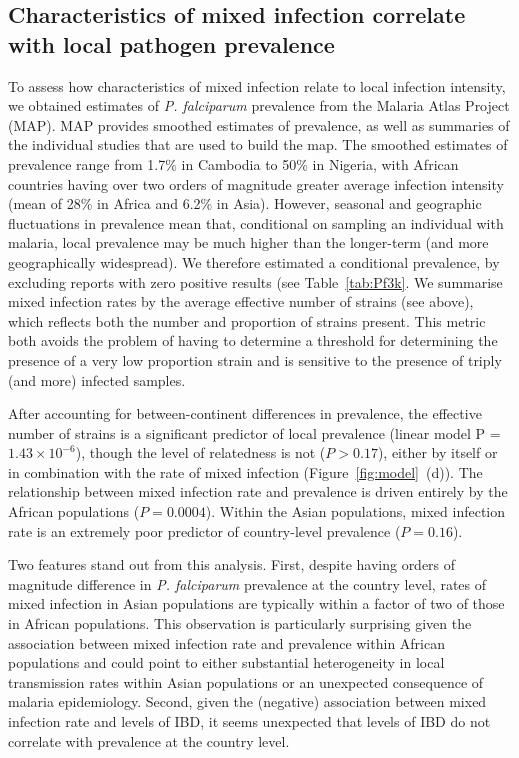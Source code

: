 \documentclass[9pt,lineno]{elife}
\begin{document}
\subsection{Characteristics of mixed infection correlate with local pathogen prevalence}


To assess how characteristics of mixed infection relate to local infection intensity, we obtained estimates of {\it P. falciparum} prevalence from the Malaria Atlas Project (MAP).  MAP provides smoothed estimates of prevalence, as well as summaries of the individual studies that are used to build the map. The smoothed estimates of prevalence  range from 1.7\% in Cambodia to 50\% in Nigeria, with African countries having over two orders of magnitude greater average infection intensity (mean of 28\% in Africa and 6.2\% in Asia). However, seasonal and geographic fluctuations in prevalence mean that, conditional on sampling an individual with malaria, local prevalence may be much higher than the longer-term (and more geographically widespread).  We therefore estimated a conditional prevalence, by excluding reports with zero positive results (see Table~\ref{tab:Pf3k}.
 We summarise mixed infection rates by the average effective number of strains (see above), which reflects both the number and proportion of strains present.  This metric both avoids the problem of having to determine a threshold for determining the presence of a very low proportion strain and is sensitive to the presence of triply (and more) infected samples.

After accounting for between-continent differences in prevalence, the effective number of strains is a significant predictor of local prevalence (linear model P = $1.43 \times 10^{-6}$), though the level of relatedness is not ($P>0.17$), either by itself or in combination with the rate of mixed infection (Figure~\ref{fig:model}~(d)).  The relationship between mixed infection rate and prevalence is driven entirely by the African populations ($P = 0.0004$).  Within the Asian populations, mixed infection rate is an extremely poor predictor of country-level prevalence ($P = 0.16$).

Two features stand out from this analysis.  First, despite having orders of magnitude difference in {\it P. falciparum} prevalence at the country level, rates of mixed infection in Asian populations are typically within a factor of two of those in African populations.  This observation is particularly surprising given the association between mixed infection rate and prevalence within African populations and could point to either substantial heterogeneity in local transmission rates within Asian populations or an unexpected consequence of malaria epidemiology.  Second, given the (negative) association between mixed infection rate and levels of IBD, it seems unexpected that levels of IBD do not correlate with prevalence at the country level.
\end{document}
